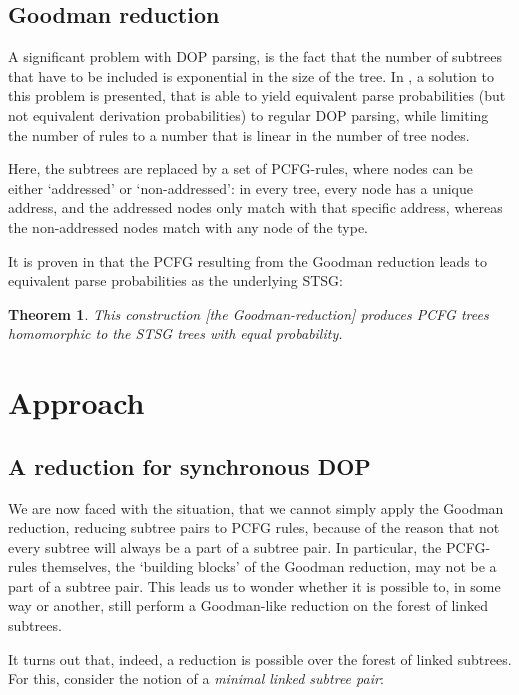 \documentclass[a4paper]{article}
\newtheorem{theorem}{Theorem}[section]
\theoremstyle{definition}
\begin{document}
\subsection{Goodman reduction}

A significant problem with DOP parsing, is the fact that the number of subtrees that have to be included is exponential in the size of the tree. In \cite{Go}, a solution to this problem is presented, that is able to yield equivalent parse probabilities (but not equivalent derivation probabilities) to regular DOP parsing, while limiting the number of rules to a number that is linear in the number of tree nodes.

Here, the subtrees are replaced by a set of PCFG-rules, where nodes can be either `addressed' or `non-addressed': in every tree, every node has a unique address, and the addressed nodes only match with that specific address, whereas the non-addressed nodes match with any node of the type.

It is proven in \cite{Go} that the PCFG resulting from the Goodman reduction leads to equivalent parse probabilities as the underlying STSG:

\begin{theorem}
This construction [the Goodman-reduction] produces PCFG trees homomorphic to the STSG trees with equal probability.
\end{theorem}

\section{Approach}

\subsection{A reduction for synchronous DOP}

We are now faced with the situation, that we cannot simply apply the Goodman reduction, reducing subtree pairs to PCFG rules, because of the reason that not every subtree will always be a part of a subtree pair. In particular, the PCFG-rules themselves, the `building blocks' of the Goodman reduction, may not be a part of a subtree pair. This leads us to wonder whether it is possible to, in some way or another, still perform a Goodman-like reduction on the forest of linked subtrees.

It turns out that, indeed, a reduction is possible over the forest of linked subtrees. For this, consider the notion of a \emph{minimal linked subtree pair}:
\end{document}
